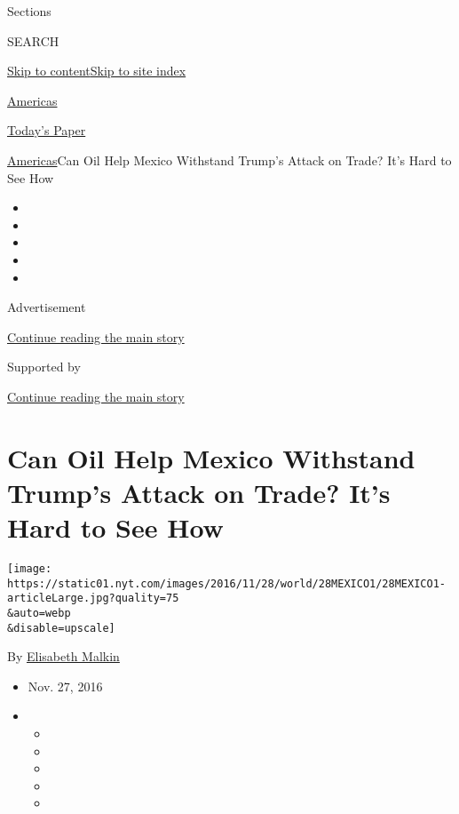Sections

SEARCH

\protect\hyperlink{site-content}{Skip to
content}\protect\hyperlink{site-index}{Skip to site index}

\href{https://www.nytimes.com/section/world/americas}{Americas}

\href{https://myaccount.nytimes.com/auth/login?response_type=cookie\&client_id=vi}{}

\href{https://www.nytimes.com/section/todayspaper}{Today's Paper}

\href{/section/world/americas}{Americas}\textbar{}Can Oil Help Mexico
Withstand Trump's Attack on Trade? It's Hard to See How

\begin{itemize}
\item
\item
\item
\item
\item
\end{itemize}

Advertisement

\protect\hyperlink{after-top}{Continue reading the main story}

Supported by

\protect\hyperlink{after-sponsor}{Continue reading the main story}

\hypertarget{can-oil-help-mexico-withstand-trumps-attack-on-trade-its-hard-to-see-how}{%
\section{Can Oil Help Mexico Withstand Trump's Attack on Trade? It's
Hard to See
How}\label{can-oil-help-mexico-withstand-trumps-attack-on-trade-its-hard-to-see-how}}

\texttt{[image: https://static01.nyt.com/images/2016/11/28/world/28MEXICO1/28MEXICO1-articleLarge.jpg?quality=75\\\&auto=webp\\\&disable=upscale]}

By \href{https://www.nytimes.com/by/elisabeth-malkin}{Elisabeth Malkin}

\begin{itemize}
\item
  Nov. 27, 2016
\item
  \begin{itemize}
  \item
  \item
  \item
  \item
  \item
  \end{itemize}
\end{itemize}

